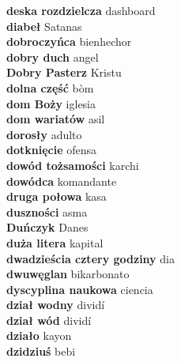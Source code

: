 \textbf{ deska rozdzielcza  } dashboard \\
\textbf{ diabeł  } Satanas \\
\textbf{ dobroczyńca  } bienhechor \\
\textbf{ dobry duch  } angel \\
\textbf{ Dobry Pasterz  } Kristu \\
\textbf{ dolna część  } bòm \\
\textbf{ dom Boży  } iglesia \\
\textbf{ dom wariatów  } asil \\
\textbf{ dorosły  } adulto \\
\textbf{ dotknięcie  } ofensa \\
\textbf{ dowód tożsamości  } karchi \\
\textbf{ dowódca  } komandante \\
\textbf{ druga połowa  } kasa \\
\textbf{ duszności  } asma \\
\textbf{ Duńczyk  } Danes \\
\textbf{ duża litera  } kapital \\
\textbf{ dwadzieścia cztery godziny  } dia \\
\textbf{ dwuwęglan  } bikarbonato \\
\textbf{ dyscyplina naukowa  } ciencia \\
\textbf{ dział wodny  } dividí \\
\textbf{ dział wód  } dividí \\
\textbf{ działo  } kayon \\
\textbf{ dzidziuś  } bebi \\
